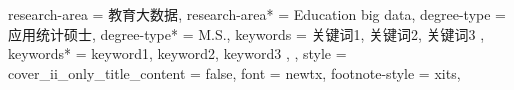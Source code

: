 {{      %
    research-area = {教育大数据},
    research-area* = {Education big data},
    degree-type = {应用统计硕士},
    degree-type* = {M.S.},
    keywords = {
      关键词1,
      关键词2,
      关键词3
    },
    keywords* = {
      keyword1,
      keyword2,
      keyword3
    },
  },
  style = {
    cover_ii_only_title_content = false,
    font = newtx,
    footnote-style = xits,
}}
